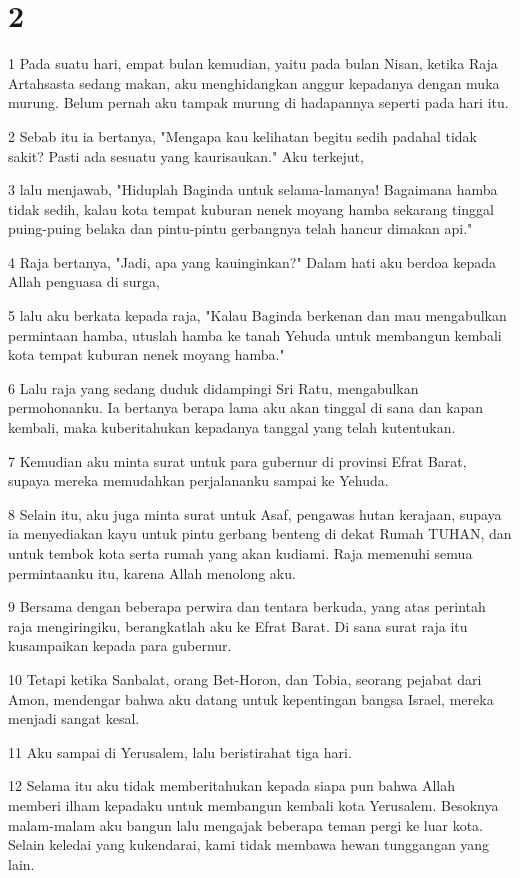 \chapter{2}

\par 1 Pada suatu hari, empat bulan kemudian, yaitu pada bulan Nisan, ketika Raja Artahsasta sedang makan, aku menghidangkan anggur kepadanya dengan muka murung. Belum pernah aku tampak murung di hadapannya seperti pada hari itu.
\par 2 Sebab itu ia bertanya, "Mengapa kau kelihatan begitu sedih padahal tidak sakit? Pasti ada sesuatu yang kaurisaukan." Aku terkejut,
\par 3 lalu menjawab, "Hiduplah Baginda untuk selama-lamanya! Bagaimana hamba tidak sedih, kalau kota tempat kuburan nenek moyang hamba sekarang tinggal puing-puing belaka dan pintu-pintu gerbangnya telah hancur dimakan api."
\par 4 Raja bertanya, "Jadi, apa yang kauinginkan?" Dalam hati aku berdoa kepada Allah penguasa di surga,
\par 5 lalu aku berkata kepada raja, "Kalau Baginda berkenan dan mau mengabulkan permintaan hamba, utuslah hamba ke tanah Yehuda untuk membangun kembali kota tempat kuburan nenek moyang hamba."
\par 6 Lalu raja yang sedang duduk didampingi Sri Ratu, mengabulkan permohonanku. Ia bertanya berapa lama aku akan tinggal di sana dan kapan kembali, maka kuberitahukan kepadanya tanggal yang telah kutentukan.
\par 7 Kemudian aku minta surat untuk para gubernur di provinsi Efrat Barat, supaya mereka memudahkan perjalananku sampai ke Yehuda.
\par 8 Selain itu, aku juga minta surat untuk Asaf, pengawas hutan kerajaan, supaya ia menyediakan kayu untuk pintu gerbang benteng di dekat Rumah TUHAN, dan untuk tembok kota serta rumah yang akan kudiami. Raja memenuhi semua permintaanku itu, karena Allah menolong aku.
\par 9 Bersama dengan beberapa perwira dan tentara berkuda, yang atas perintah raja mengiringiku, berangkatlah aku ke Efrat Barat. Di sana surat raja itu kusampaikan kepada para gubernur.
\par 10 Tetapi ketika Sanbalat, orang Bet-Horon, dan Tobia, seorang pejabat dari Amon, mendengar bahwa aku datang untuk kepentingan bangsa Israel, mereka menjadi sangat kesal.
\par 11 Aku sampai di Yerusalem, lalu beristirahat tiga hari.
\par 12 Selama itu aku tidak memberitahukan kepada siapa pun bahwa Allah memberi ilham kepadaku untuk membangun kembali kota Yerusalem. Besoknya malam-malam aku bangun lalu mengajak beberapa teman pergi ke luar kota. Selain keledai yang kukendarai, kami tidak membawa hewan tunggangan yang lain.

